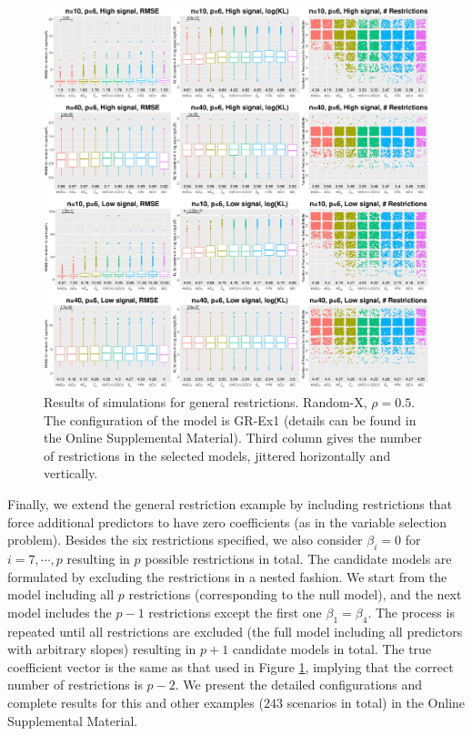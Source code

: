 \begin{figure}[!ht]
  \centering
  \includegraphics[width=\textwidth]{figures/main/randomx_GR-Ex1.eps}
  \caption{Results of simulations for general restrictions. Random-X, $\rho=0.5$. The configuration of the model is GR-Ex1 (details can be found in the Online Supplemental Material). Third column gives the number of restrictions in the selected models, jittered horizontally and vertically. }
  \label{fig:generalrestriction_randomx}
\end{figure}

Finally, we extend the general restriction example by including restrictions that force additional predictors to have zero coefficients (as in the variable selection problem). Besides the six restrictions specified, we also consider $\beta_i=0$ for $i=7,\cdots,p$ resulting in $p$ possible restrictions in total. The candidate models are formulated by excluding the restrictions in a nested fashion. We start from the model including all $p$ restrictions (corresponding to the null model), and the next model includes the $p-1$ restrictions except the first one $\beta_1=\beta_4$. The process is repeated until all restrictions are excluded (the full model including all predictors with arbitrary slopes) resulting in $p+1$ candidate models in total. The true coefficient vector is the same as that used in Figure \ref{fig:generalrestriction_randomx}, implying that the correct number of restrictions is $p-2$. We present the detailed configurations and complete results for this and other examples ($243$ scenarios in total) in the Online Supplemental Material. 


